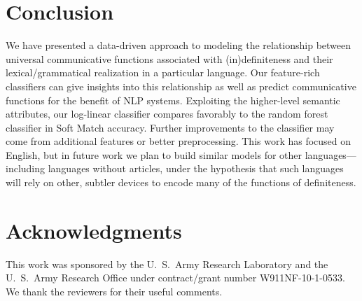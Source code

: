 \documentclass[11pt,letterpaper]{article}
\begin{document}
\section{Conclusion}\label{sec:conclusion}

We have presented a data-driven approach to modeling the relationship between 
universal communicative functions associated with (in)definiteness and their lexical\slash grammatical realization in a particular language.
Our feature-rich classifiers can give insights into this relationship
as well as predict communicative functions for the benefit of NLP systems.
Exploiting the higher-level semantic attributes, our log-linear classifier compares favorably to the random forest classifier in Soft Match accuracy. 
Further improvements to the classifier may come from additional features or better preprocessing.
This work has focused on English, but in future work we plan to build similar models for other languages---including 
languages without articles, under the hypothesis that such languages will rely on other, subtler devices to encode
many of the functions of definiteness. 


\section*{Acknowledgments}
This work was sponsored by the U.~S.~Army Research Laboratory and the
U.~S.~Army Research Office under contract/grant number
W911NF-10-1-0533. We thank the reviewers for their useful comments.



\setlength{\bibsep}{10pt}
{\fontsize{10}{12.25}\selectfont
}
\end{document}
